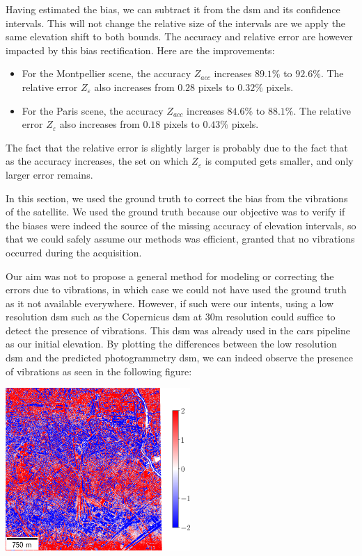 Having estimated the bias, we can subtract it from the \acrshort{dsm} and its confidence intervals. This will not change the relative size of the intervals are we apply the same elevation shift to both bounds. The accuracy and relative error are however impacted by this bias rectification. Here are the improvements:
\begin{itemize}
    \item For the Montpellier scene, the accuracy $Z_{acc}$ increases $89.1\%$ to $92.6\%$. The relative error $Z_\varepsilon$ also increases from $0.28$ pixels to $0.32\%$ pixels.
    \item For the Paris scene, the accuracy $Z_{acc}$ increases $84.6\%$ to $88.1\%$. The relative error $Z_\varepsilon$ also increases from $0.18$ pixels to $0.43\%$ pixels.  
\end{itemize}
The fact that the relative error is slightly larger is probably due to the fact that as the accuracy increases, the set on which $Z_\varepsilon$ is computed gets smaller, and only larger error remains. 

\begin{remark}
    In this section, we used the ground truth to correct the bias from the vibrations of the satellite. We used the ground truth because our objective was to verify if the biases were indeed the source of the missing accuracy of elevation intervals, so that we could safely assume our methods was efficient, granted that no vibrations occurred during the acquisition. 
    
    Our aim was not to propose a general method for modeling or correcting the errors due to vibrations, in which case we could not have used the ground truth as it not available everywhere. However, if such were our intents, using a low resolution \acrshort{dsm} such as the Copernicus \acrshort{dsm} at 30m resolution could suffice to detect the presence of vibrations. This \acrshort{dsm} was already used in the \acrshort{cars} pipeline as our initial elevation. By plotting the differences between the low resolution \acrshort{dsm} and the predicted photogrammetry \acrshort{dsm}, we can indeed observe the presence of vibrations as seen in the following figure:
    
    {\centering\includegraphics[width=7cm]{Images/Chap_6/copernicus_bias_Montpellier.png}
    }
\end{remark}


